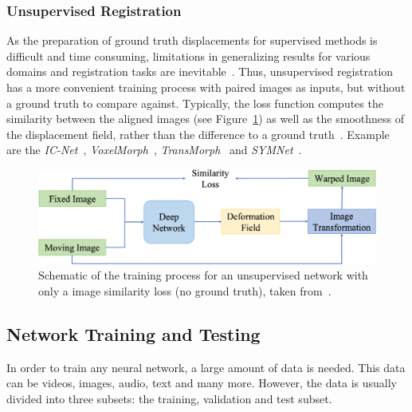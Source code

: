 \subsubsection{Unsupervised Registration} \label{SubSubSec:UnsupervisedRegistration}
As the preparation of ground truth displacements for supervised methods is difficult and time consuming, limitations in generalizing results for various domains and registration tasks are inevitable~\cite{Chen2023}. Thus, unsupervised registration has a more convenient training process with paired images as inputs, but without a ground truth to compare against. Typically, the loss function computes the similarity between the aligned images (see Figure~\ref{fig:UnsupervisedRegistration}) as well as the smoothness of the displacement field, rather than the difference to a ground truth~\cite{Zou2022}. Example are the \emph{IC-Net}~\cite{IC-Net},  \emph{VoxelMorph}~\cite{Voxelmorph}, \emph{TransMorph}~\cite{TransMorph} and \emph{SYMNet}~\cite{SYM-Net}.

\begin{figure}[h] %
	\centering
	\graphicspath{{images/}{\main/images/}}
	\includegraphics[width=\linewidth]{UnsupervisedRegistrationGraph.jpg} 
	\caption{Schematic of the training process for an unsupervised network with only a image similarity loss (no ground truth), taken from~\cite{Zou2022}.}
	\label{fig:UnsupervisedRegistration}
\end{figure}


\subsection{Network Training and Testing} \label{SubSec:NetworkTrainingAndTesting}
In order to train any neural network, a large amount of data is needed. This data can be videos, images, audio, text and many more. However, the data is usually divided into three subsets: the training, validation and test subset. 

